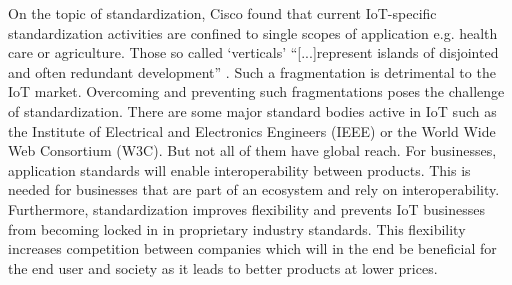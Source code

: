 		On the topic of standardization, Cisco found that current IoT-specific standardization activities are confined to single scopes of application e.g. health care or agriculture. Those so called `verticals' ``[...]represent islands of disjointed and often redundant development'' \cite{cisco}. Such a fragmentation is detrimental to the IoT market. Overcoming and preventing such fragmentations poses the challenge of standardization. There are some major standard bodies active in IoT such as the Institute of Electrical and Electronics Engineers (IEEE) or the World Wide Web Consortium (W3C). But not all of them have global reach. For businesses, application standards will enable interoperability between products. This is needed for businesses that are part of an ecosystem and rely on interoperability. Furthermore, standardization improves flexibility and prevents IoT businesses from becoming locked in in proprietary industry standards. This flexibility increases competition between companies which will in the end be beneficial for the end user and society as it leads to better products at lower prices.
%
\vspace{-1em}
